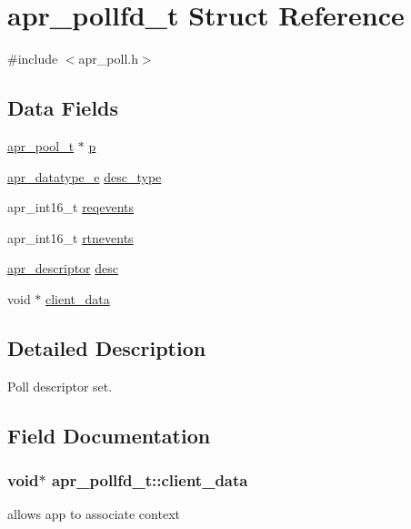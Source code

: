 \hypertarget{structapr__pollfd__t}{}\section{apr\+\_\+pollfd\+\_\+t Struct Reference}
\label{structapr__pollfd__t}


{\ttfamily \#include $<$apr\+\_\+poll.\+h$>$}

\subsection*{Data Fields}
\begin{DoxyCompactItemize}
\item 
\hyperlink{group__apr__pools_gaf137f28edcf9a086cd6bc36c20d7cdfb}{apr\+\_\+pool\+\_\+t} $\ast$ \hyperlink{structapr__pollfd__t_adae68586ed671472590efe8770de38cc}{p}
\item 
\hyperlink{group__apr__poll_ga0a8549d84c1721788b102a4cc8b4b0f0}{apr\+\_\+datatype\+\_\+e} \hyperlink{structapr__pollfd__t_acfafd260241a874745f49ba2df246c53}{desc\+\_\+type}
\item 
apr\+\_\+int16\+\_\+t \hyperlink{structapr__pollfd__t_abcedac7097a97823a38ece6e47f4ea9f}{reqevents}
\item 
apr\+\_\+int16\+\_\+t \hyperlink{structapr__pollfd__t_aed5b2109b27984975309922bfa84e3f6}{rtnevents}
\item 
\hyperlink{unionapr__descriptor}{apr\+\_\+descriptor} \hyperlink{structapr__pollfd__t_ad63baa71bb91f80513d33482e28fb967}{desc}
\item 
void $\ast$ \hyperlink{structapr__pollfd__t_a01220e7a71963456461baa40b2a05716}{client\+\_\+data}
\end{DoxyCompactItemize}


\subsection{Detailed Description}
Poll descriptor set. 

\subsection{Field Documentation}
\subsubsection[{\texorpdfstring{client\+\_\+data}{client_data}}]{\setlength{\rightskip}{0pt plus 5cm}void$\ast$ apr\+\_\+pollfd\+\_\+t\+::client\+\_\+data}\hypertarget{structapr__pollfd__t_a01220e7a71963456461baa40b2a05716}{}\label{structapr__pollfd__t_a01220e7a71963456461baa40b2a05716}
allows app to associate context 
